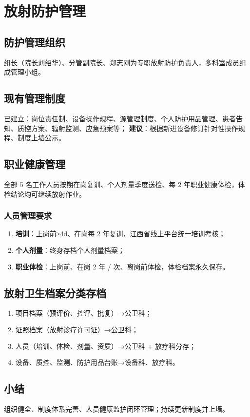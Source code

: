 \chapter{放射防护管理}

\section{防护管理组织}

组长（院长刘绍华）、分管副院长、郑志刚为专职放射防护负责人，多科室成员组成管理小组。

\section{现有管理制度}

已建立：岗位责任制、设备操作规程、源管理制度、个人防护用品管理、患者告知、质控方案、辐射监测、应急预案等；
\textbf{建议}：根据新进设备修订针对性操作规程、制度上墙公示。

\section{职业健康管理}


全部 5 名工作人员按期在岗复训、个人剂量季度送检、每 2 年职业健康体检，体检结论均可继续放射作业。

\subsection{人员管理要求}

\begin{enumerate}
\item \textbf{培训}：上岗前≥4d、在岗每 2 年复训，江西省线上平台统一培训考核；
\item \textbf{个人剂量}：终身存档个人剂量档案；
\item \textbf{职业体检}：上岗前、在岗 2 年 / 次、离岗前体检，体检档案永久保存。
\end{enumerate}

\section{放射卫生档案分类存档}

\begin{enumerate}
\item 项目档案（预评价、控评、批复）→公卫科；
\item 证照档案（放射诊疗许可证）→公卫科；
\item 人员（培训、体检、剂量、资质）→公卫科 + 放疗科分存；
\item 设备、质控、监测、防护用品台账→设备科、放疗科。
\end{enumerate}

\section{小结}

组织健全、制度体系完善、人员健康监护闭环管理；持续更新制度并上墙。

